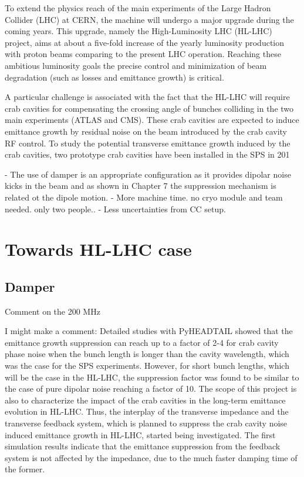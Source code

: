 
To extend the physics reach of the main experiments of the Large Hadron Collider (LHC) at CERN, the machine will undergo a major upgrade during the coming years. This upgrade, namely the High-Luminosity LHC (HL-LHC) project, aims at about a five-fold increase of the yearly luminosity production with proton beams comparing to the present LHC operation. Reaching these ambitious luminosity goals the precise control and minimization of beam degradation (such as losses and emittance growth) is critical.


 A particular challenge is associated with the fact that the HL-LHC will require crab cavities for compensating the crossing angle of bunches colliding in the two main experiments (ATLAS and CMS). These crab cavities are expected to induce emittance growth by residual noise on the beam introduced by the crab cavity RF control. To study the potential transverse emittance growth induced by the crab cavities, two prototype crab cavities have been installed in the SPS in 201


\newpage
- The use of damper is an appropriate configuration as it provides dipolar noise kicks in the beam and as shown in Chapter 7 the suppression mechanism is related ot the dipole motion. 
- More machine time. no cryo module and team needed. only two people..
- Less uncertainties from CC setup.




\section{Towards HL-LHC case}
\subsection{Damper}
Comment on the 200 MHz

I might make a comment:
Detailed studies with PyHEADTAIL showed that the emittance growth suppression can reach up to a factor of 2-4 for crab cavity phase noise when the bunch length is longer than the cavity wavelength, which was the case for the SPS experiments. However, for short bunch lengths, which will be the case in the HL-LHC, the suppression factor was found to be similar to the case of pure dipolar noise reaching a factor of 10. The scope of this project is also to characterize the impact of the crab cavities in the long-term emittance evolution in HL-LHC. Thus, the interplay of the transverse impedance and the transverse feedback system, which is planned to suppress the crab cavity noise induced emittance growth in HL-LHC, started being investigated. The first simulation results indicate that the emittance suppression from the feedback system is not affected by the impedance, due to the much faster damping time of the former.
